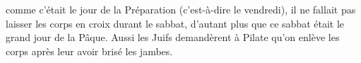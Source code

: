 \encetemps comme c’était le jour de la Préparation (c’est-à-dire le vendredi),
	il ne fallait pas laisser les corps en croix durant le sabbat,
	d’autant plus que ce sabbat était le grand jour de la Pâque.
Aussi les Juifs demandèrent à Pilate qu’on enlève les corps
	après leur avoir brisé les jambes.
